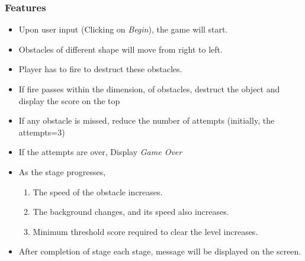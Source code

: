 \documentclass[]{beamer}
\begin{document}
\begin{frame}
  \frametitle{Features}
    \begin{center}
  \begin{itemize}
    \item Upon user input (Clicking on \textit{Begin}), the game will start.
    \item Obstacles of different shape will move from right to left. 
    \item Player has to fire to destruct these obstacles.
    \item If fire passes within the dimension, of obstacles, destruct the object 
	and display the score on the top
    \item If any obstacle is missed, reduce the number of attempts (initially, the attempts=3) 
    \item If the attempts are over, Display \textit{Game Over}
    \item As the stage progresses, 
    \begin{enumerate}
     \item The speed of the obstacle increases.
     \item The background changes, and its speed also increases.
     \item Minimum threshold score required to clear the level increases. 
    \end{enumerate}
   \item After completion of stage each stage, message will be displayed on the screen.
    
  \end{itemize}
   
  \end{center}
\end{frame}
\end{document}
